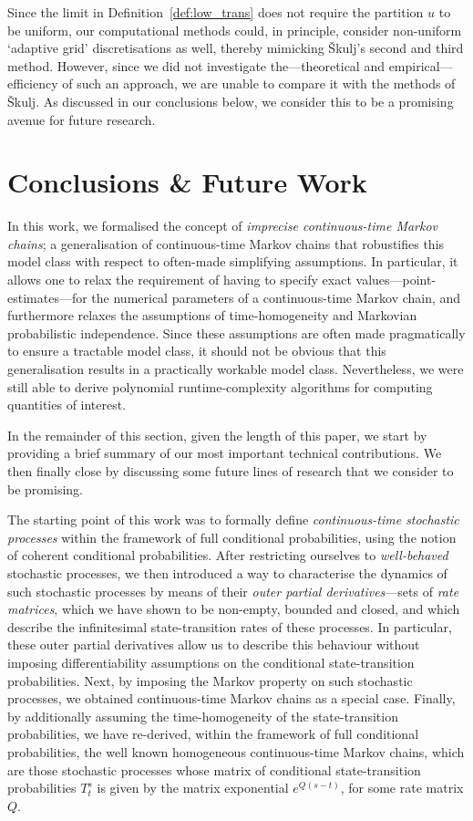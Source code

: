\documentclass[10pt,a4paper]{paper}
\theoremstyle{definition}
\begin{document}
Since the limit in Definition~\ref{def:low_trans} does not require the partition $u$ to be uniform, our computational methods could, in principle, consider non-uniform `adaptive grid' discretisations as well, thereby mimicking \v{S}kulj's second and third method. However, since we did not investigate the---theoretical and empirical---efficiency of such an approach, we are unable to compare it with the methods of \v{S}kulj. As discussed in our conclusions below, we consider this to be a promising avenue for future research.



\section{Conclusions \& Future Work}\label{sec:conclusions}

In this work, we formalised the concept of \emph{imprecise continuous-time Markov chains}; a generalisation of continuous-time Markov chains that robustifies this model class with respect to often-made simplifying assumptions. 
%
In particular, it allows one to relax the requirement of having to specify exact values---point-estimates---for the numerical parameters of a continuous-time Markov chain, and furthermore relaxes the assumptions of time-homogeneity and Markovian probabilistic independence. Since these assumptions are often made pragmatically to ensure a tractable model class, it should not be obvious that this generalisation results in a practically workable model class. Nevertheless, we were still able to derive polynomial runtime-complexity algorithms for computing quantities of interest.


In the remainder of this section, given the length of this paper, we start by providing a brief summary of our most important technical contributions. We then finally close by discussing some future lines of research that we consider to be promising.

The starting point of this work was to formally define \emph{continuous-time stochastic processes} within the framework of full conditional probabilities, using the notion of coherent conditional probabilities. After restricting ourselves to \emph{well-behaved} stochastic processes, we then introduced a way to characterise the dynamics of such stochastic processes by means of their \emph{outer partial derivatives}---sets of \emph{rate matrices}, which we have shown to be non-empty, bounded and closed, and which describe the infinitesimal state-transition rates of these processes. In particular, these outer partial derivatives allow us to describe this behaviour without imposing differentiability assumptions on the conditional state-transition probabilities. Next, by imposing the Markov property on such stochastic processes, we obtained continuous-time Markov chains as a special case. Finally, by additionally assuming the time-homogeneity of the state-transition probabilities, we have re-derived, within the framework of full conditional probabilities, the well known homogeneous continuous-time Markov chains, which are those stochastic processes whose matrix of conditional state-transition probabilities $T_t^s$ is given by the matrix exponential $e^{Q(s-t)}$, for some rate matrix $Q$.
\end{document}
